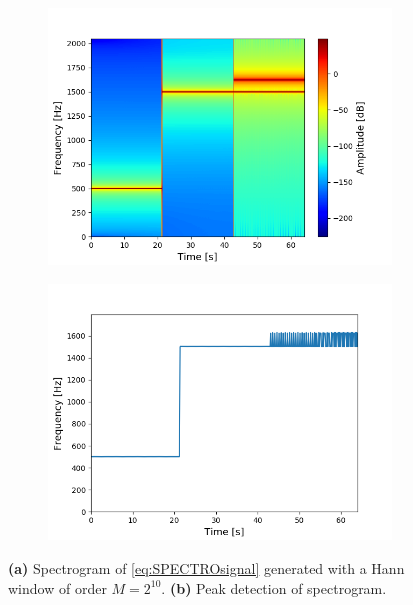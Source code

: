 \begin{figure}[H]
\centering
\begin{subfigure}{0.49\textwidth}
\centering
\includegraphics[width=\textwidth]{figures/validation/stft/peak/spectro1024.png}
\caption{}
\label{fig:1024spec}
\end{subfigure}
\begin{subfigure}{0.49\textwidth}
\centering
\includegraphics[width=\textwidth]{figures/validation/stft/peak/peak1024.png}
\caption{}
\label{fig:1024peak}
\end{subfigure}
\caption{\textbf{(a)} Spectrogram of \eqref{eq:SPECTROsignal} generated with a Hann window of order $M=2^{10}$. \textbf{(b)} Peak detection of spectrogram.}
\label{fig:1024}
\end{figure}
